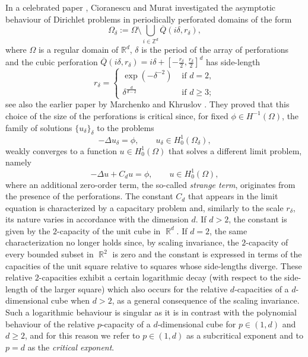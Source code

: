 \documentclass{article}
\theoremstyle{plain}
\theoremstyle{definition}
\def\rr{{\mathbb R}}
\def\ZZ{{\mathbb Z}}
\DeclareMathOperator*{\R}{\mathbb{R}}
\newcommand{\Q}
{\overline{Q}}
\numberwithin{equation}{section}
\begin{document}
In a celebrated paper \cite{CioMur}, Cioranescu and Murat investigated the asymptotic behaviour of Dirichlet problems in periodically perforated domains of the form
\begin{equation*}\Omega_\delta:=\Omega\setminus \bigcup_{i\in \ZZ^d} \Q(i\delta,r_\delta),
\end{equation*}
where $\Omega$ is a regular domain of $\rr^d$, $\delta$ is the period of the array of perforations and the cubic perforation $\Q(i\delta, r_\delta)=i\delta+[-\frac{r_\delta}{2},\frac{r_\delta}{2}]^d$ has side-length
\begin{equation*}
    r_\delta= \begin{cases}
   \exp(-\delta^{-2}) & \text{ if } d=2, \\[5pt]
     \delta^\frac{d}{d-2} & \text{ if } d\geq 3;
    \end{cases}
\end{equation*}
see also the earlier paper by Marchenko and Khruslov \cite{MK}. They proved that  this choice of the size of the perforations is critical since, for fixed $\phi\in H^{-1}(\Omega)$, the family of solutions $\{u_\delta\}_\delta$ to the problems
\begin{equation*}
    -\Delta u_\delta = \phi, \qquad u_\delta\in H^1_0(\Omega_\delta),
\end{equation*}
weakly converges to a function $u\in H^1_0(\Omega)$ that solves a different limit problem, namely
\begin{equation*}
     -\Delta u + C_d u = \phi, \qquad u\in H^1_0(\Omega),
\end{equation*}
where an additional zero-order term, the so-called {\em strange term}, originates from the presence of the perforations. The constant $C_d$ that appears in the limit equation is characterized by a capacitary problem and, similarly to the scale $r_\delta$, its nature varies in accordance with the dimension $d$. If $d>2$, the constant is given by the $2$-capacity of the unit cube in $\R^d$. If $d=2$, the same characterization no longer holds since, by scaling invariance, the $2$-capacity of every bounded subset in $\R^2$ is zero and the constant is expressed in terms of the capacities of the unit square relative to squares whose side-lengths diverge. These relative $2$-capacities exhibit a certain logarithmic decay (with respect to the side-length of the larger square) which also occurs for the relative $d$-capacities of a $d$-dimensional cube when $d>2$, as a general consequence of the scaling invariance. Such a logarithmic behaviour is singular as it is in contrast with the polynomial behaviour of the relative $p$-capacity of a $d$-dimensional cube for $p\in(1,d)$ and $d\geq 2$, and for this reason we refer to $p\in(1,d)$ as a subcritical exponent and to $p=d$ as the {\em critical exponent}. 
\end{document}
